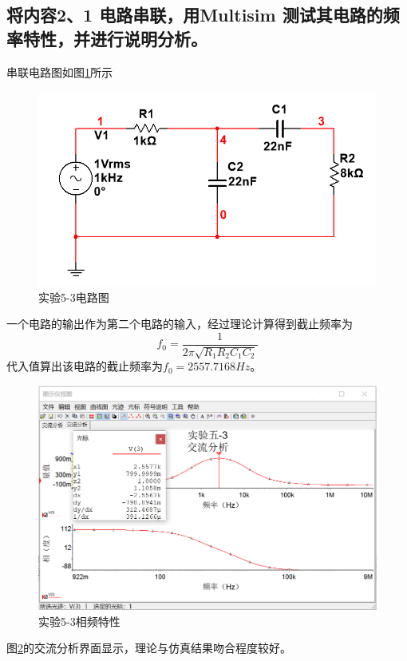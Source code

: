 \documentclass{ctexart}
\begin{document}
\subsection{将内容2、1 电路串联，用Multisim 测试其电路的频率特性，并进行说明分析。}
串联电路图如图\ref{fig:实验5-3电路图}所示
\begin{figure}[h]
    \centering
    \includegraphics[scale=0.5]{pic/实验5-3电路图.png}
    \caption{实验5-3电路图}
    \label{fig:实验5-3电路图}
\end{figure}
一个电路的输出作为第二个电路的输入，经过理论计算得到截止频率为
\begin{equation}
    f_0=\dfrac{1}{2\pi \sqrt{R_1R_2C_1C_2}}
\end{equation}
代入值算出该电路的截止频率为$f_0=2557.7168Hz$。
\begin{figure}[h]
    \centering
    \includegraphics[scale=0.5]{pic/实验5-3相频特性.png}
    \caption{实验5-3相频特性}
    \label{fig:实验5-3相频特性}
\end{figure}
图\ref{fig:实验5-3相频特性}的交流分析界面显示，理论与仿真结果吻合程度较好。
\end{document}
